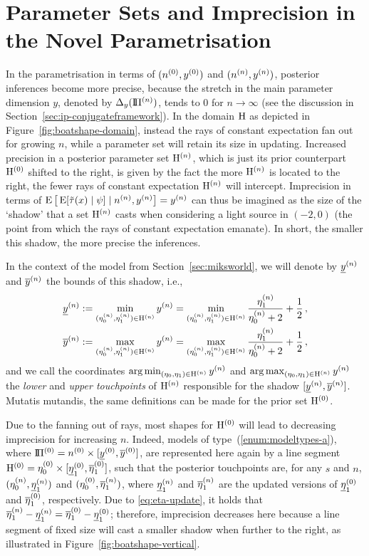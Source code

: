 \section{Parameter Sets and Imprecision in the Novel Parametrisation}
\label{boatshape-rationale}

In the parametrisation in terms of $(n^{(0)},y^{(0)})$ and $(n^{(n)}, y^{(n)})$,
posterior inferences become more precise,
because the stretch in the main parameter dimension $y$, denoted by $\Delta_y(\text{I}\!\Pi^{(n)})$,
tends to $0$ for $n \to \infty$ (see the discussion in Section~\ref{sec:ip-conjugateframework}).
In the domain $\mathrm{H}$ as depicted in Figure~\ref{fig:boatshape-domain},
instead the rays of constant expectation fan out for growing $n$, %
while a parameter set will retain its size in updating.
Increased precision in a posterior parameter set $\mathrm{H}^{(n)}$, which is just
its prior counterpart $\mathrm{H}^{(0)}$ shifted to the right,
is given by the fact the more $\mathrm{H}^{(n)}$ is located to the right,
the fewer rays of constant expectation $\mathrm{H}^{(n)}$ will intercept.
Imprecision in terms of $\operatorname{E}\big[\operatorname{E}[\tilde{\tau}(x) \mid \psi] \mid n^{(n)}, y^{(n)}\big] = y^{(n)}$
can thus be imagined as the size of the `shadow' that a set $\mathrm{H}^{(n)}$ casts
when considering a light source in $(-2,0)$ (the point from which the rays of constant expectation emanate).
In short, the smaller this shadow, the more precise the inferences.

In the context of the model from Section~\ref{sec:miksworld},
we will denote by $\underline{y}^{(n)}$ and $\overline{y}^{(n)}$ the bounds of this shadow,
i.e.,
\begin{align*}
\underline{y}^{(n)} &:= \min_{(\eta_0^{(n)},\eta_1^{(n)}) \in \mathrm{H}^{(n)}} y^{(n)} = \min_{(\eta_0^{(n)},\eta_1^{(n)}) \in \mathrm{H}^{(n)}} \frac{\eta_1^{(n)}}{\eta_0^{(n)}+2} + \frac{1}{2}\,, \\
\overline{y}^{(n)} &:= \max_{(\eta_0^{(n)},\eta_1^{(n)}) \in \mathrm{H}^{(n)}} y^{(n)} = \max_{(\eta_0^{(n)},\eta_1^{(n)}) \in \mathrm{H}^{(n)}} \frac{\eta_1^{(n)}}{\eta_0^{(n)}+2} + \frac{1}{2}\,,
\end{align*}
and we call the coordinates $\arg\min_{(\eta_0,\eta_1) \in \mathrm{H}^{(n)}} y^{(n)}$ and $\arg\max_{(\eta_0,\eta_1) \in \mathrm{H}^{(n)}} y^{(n)}$
the \emph{lower} and \emph{upper touchpoints} of $\mathrm{H}^{(n)}$ responsible for the shadow $[\underline{y}^{(n)}, \overline{y}^{(n)}]$.
Mutatis mutandis, the same definitions can be made for the prior set $\mathrm{H}^{(0)}$.

Due to the fanning out of rays, most shapes for $\mathrm{H}^{(0)}$ will lead to decreasing imprecision for increasing $n$.
Indeed, models of type~(\ref{enum:modeltypes-a}),
where $\text{I}\!\Pi^{(0)} = n^{(0)} \times [\underline{y}^{(0)}, \overline{y}^{(0)}]$,
are represented here again by a line segment $\mathrm{H}^{(0)} = \eta_0^{(0)} \times [\underline{\eta}_1^{(0)},\overline{\eta}_1^{(0)}]$,
such that the posterior touchpoints are, for any $s$ and $n$, $(\eta_0^{(n)},\underline{\eta}_1^{(n)})$ and $(\eta_0^{(0)},\overline{\eta}_1^{(n)})$,
where $\underline{\eta}_1^{(n)}$ and $\overline{\eta}_1^{(n)}$ are the updated versions of $\underline{\eta}_1^{(0)}$ and $\overline{\eta}_1^{(0)}$, respectively.
Due to \eqref{eq:eta-update}, it holds that $\overline{\eta}_1^{(n)}-\underline{\eta}_1^{(n)} = \overline{\eta}_1^{(0)}-\underline{\eta}_1^{(0)}$;
therefore, imprecision decreases here because a line segment of fixed size
will cast a smaller shadow when further to the right,
as illustrated in Figure~\ref{fig:boatshape-vertical}.

